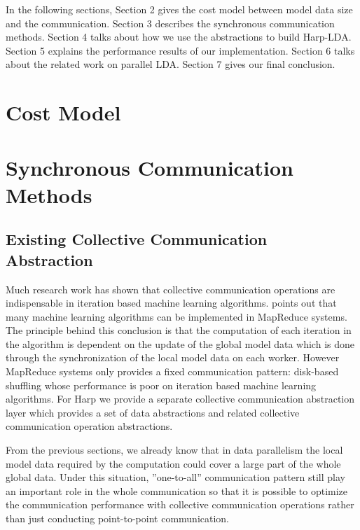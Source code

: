 \documentclass[conference]{IEEEtran}
\begin{document}
In the following sections,
Section 2 gives the cost model between model data size and the communication.
Section 3 describes the synchronous communication methods.
Section 4 talks about how we use the abstractions to build Harp-LDA.
Section 5 explains the performance results of our implementation.
Section 6 talks about the related work on parallel LDA.
Section 7 gives our final conclusion.
\section{Cost Model}
% 
%
%
%
\section{Synchronous Communication Methods}
\subsection{Existing Collective Communication Abstraction}
Much research work has shown that collective communication operations
are indispensable in iteration based machine learning algorithms.
\cite{26} points out that 
many machine learning algorithms can be implemented in MapReduce systems.
The principle behind this conclusion
is that the computation of each iteration in the algorithm 
is dependent on the update of the global model data
which is done through the synchronization of the local model data on each worker. 
However MapReduce systems only provides a fixed communication pattern:
disk-based shuffling whose performance is poor on
iteration based machine learning algorithms. 
For Harp we provide a separate collective communication abstraction layer 
which provides a set of data abstractions
and related collective communication operation abstractions.

From the previous sections,
we already know that in data parallelism
the local model data required by the computation
could cover a large part of the whole global data. 
Under this situation, ''one-to-all'' communication pattern still play an important role 
in the whole communication so that it is possible to optimize the communication performance 
with collective communication operations rather than just conducting point-to-point communication.
\end{document}
